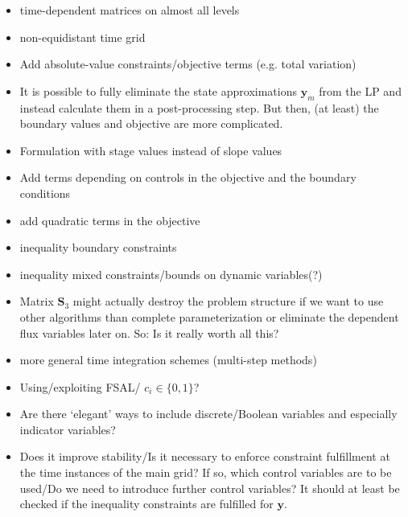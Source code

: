 \documentclass{article}
\newcommand{\vectorfont}[1]{\boldsymbol{#1}}%
\newcommand{\matrixfont}[1]{\mathbf{#1}}%
\newcommand{\yvec}{\vectorfont{y}}
\newcommand{\Smat}{\matrixfont{S}}
\begin{document}
\begin{itemize}
  \item time-dependent matrices on almost all levels
	\item non-equidistant time grid
	\item Add absolute-value constraints/objective terms (e.g. total variation)
	\item It is possible to fully eliminate the state approximations $\yvec_{m}$ from the LP and instead calculate them in a post-processing step.
	But then, (at least) the boundary values and objective are more complicated.
	\item Formulation with stage values instead of slope values
	\item Add terms depending on controls in the objective and the boundary conditions
	\item add quadratic terms in the objective
	\item inequality boundary constraints
	\item inequality mixed constraints/bounds on dynamic variables(?)
	\item Matrix $\Smat_3$ might actually destroy the problem structure if we want to use other algorithms than complete parameterization or eliminate the dependent flux variables later on. So: Is it really worth all this?
	\item more general time integration schemes (multi-step methods)
	\item Using/exploiting FSAL/ $c_i \in \lbrace 0,1\rbrace$?
	\item Are there `elegant' ways to include discrete/Boolean variables and especially indicator variables?
	\item Does it improve stability/Is it necessary to enforce constraint fulfillment at the time instances of the main grid? If so, which control variables are to be used/Do we need to introduce further control variables?
	It should at least be checked if the inequality constraints are fulfilled for $\yvec$.
\end{itemize}
\end{document}
